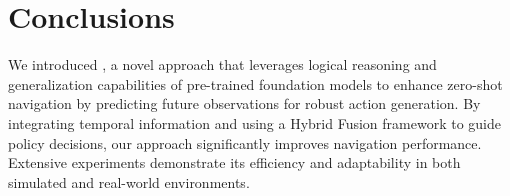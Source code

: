 \section{Conclusions}
\label{sec_conclusions}
We introduced \mname , a novel approach that leverages logical reasoning and generalization capabilities of pre-trained foundation models to enhance zero-shot navigation by predicting future observations for robust action generation. By integrating temporal information and using a Hybrid Fusion framework to guide policy decisions, our approach significantly improves navigation performance. Extensive experiments demonstrate its efficiency and adaptability in both simulated and real-world environments.
